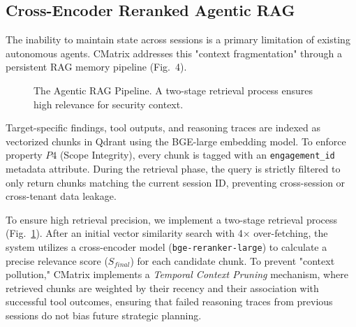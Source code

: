 \documentclass[conference,compsoc]{IEEEtran}
\begin{document}
\subsection{Cross-Encoder Reranked Agentic RAG}
The inability to maintain state across sessions is a primary limitation of existing autonomous agents. CMatrix addresses this "context fragmentation" through a persistent RAG memory pipeline (Fig.~4). 

\begin{figure}[htbp]
\centering
{}
\caption{The Agentic RAG Pipeline. A two-stage retrieval process ensures high relevance for security context.}
\label{fig:rag}
\end{figure}

Target-specific findings, tool outputs, and reasoning traces are indexed as vectorized chunks in Qdrant using the BGE-large embedding model. To enforce property $P4$ (Scope Integrity), every chunk is tagged with an \texttt{engagement_id} metadata attribute. During the retrieval phase, the query is strictly filtered to only return chunks matching the current session ID, preventing cross-session or cross-tenant data leakage.

To ensure high retrieval precision, we implement a two-stage retrieval process (Fig.~\ref{fig:rag}). After an initial vector similarity search with 4$\times$ over-fetching, the system utilizes a cross-encoder model (\texttt{bge-reranker-large}) to calculate a precise relevance score ($S_{final}$) for each candidate chunk. To prevent "context pollution," CMatrix implements a \textit{Temporal Context Pruning} mechanism, where retrieved chunks are weighted by their recency and their association with successful tool outcomes, ensuring that failed reasoning traces from previous sessions do not bias future strategic planning.
\end{document}
